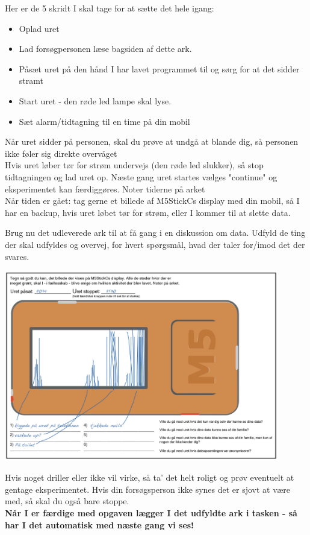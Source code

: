 \documentclass{ucph-handout}
\newcounter{handout}
\newcommand{\Ark}{Ark \#\arabic{handout} -- }
\begin{document}
\renewcommand{\Title}{\Ark Opgaven hjemme}
\begin{exercisebox}[adjusted title=Forberedelse]
Her er de 5 skridt I skal tage for at sætte det hele igang:
\begin{itemize}
    \item Oplad uret
    \item Lad forsøgpersonen læse bagsiden af dette ark.
    \item Påsæt uret på den hånd I har lavet programmet til og sørg for at det sidder stramt
    \item Start uret - den røde led lampe skal lyse.
    \item Sæt alarm/tidtagning til en time på din mobil
\end{itemize}


Når uret sidder på personen, skal du prøve at undgå at blande dig, så personen ikke føler sig direkte overvåget\\

Hvis uret løber tør for strøm undervejs (den røde led slukker), så stop tidtagningen og lad uret op. Næste gang uret startes vælges "continue" og eksperimentet kan færdiggøres. Noter tiderne på arket\\

Når tiden er gået: tag gerne et billede af M5StickCs display med din mobil, så I har en backup, hvis uret løbet tør for strøm, eller I kommer til at slette data.\\ 

Brug nu det udleverede ark til at få gang i en diskussion om data. Udfyld de ting der skal udfyldes og overvej, for hvert spørgsmål, hvad der taler for/imod det der svares. 

\includegraphics[width=0.9\textwidth]{billeder/udfyldtsp.png}

Hvis noget driller eller ikke vil virke, så ta' det helt roligt og prøv eventuelt at gentage eksperimentet. Hvis din forsøgsperson ikke synes det er sjovt at være med, så skal du også bare stoppe. \\

\textbf{Når I er færdige med opgaven lægger I det udfyldte ark i tasken - så har I det automatisk med næste gang vi ses!}
\end{exercisebox}
\end{document}

